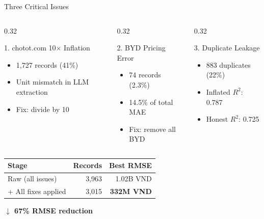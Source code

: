 \documentclass[aspectratio=169]{beamer}
\begin{document}
\begin{frame}{Three Critical Issues}
  \begin{columns}[T]
    \begin{column}{0.32\textwidth}
      \begin{block}{\small 1. chotot.com 10$\times$ Inflation}
        \small
        \begin{itemize}
          \item 1,727 records (41\%)
          \item Unit mismatch in LLM extraction
          \item Fix: divide by 10
        \end{itemize}
      \end{block}
    \end{column}
    \begin{column}{0.32\textwidth}
      \begin{block}{\small 2. BYD Pricing Error}
        \small
        \begin{itemize}
          \item 74 records (2.3\%)
          \item 14.5\% of total MAE
          \item Fix: remove all BYD
        \end{itemize}
      \end{block}
    \end{column}
    \begin{column}{0.32\textwidth}
      \begin{block}{\small 3. Duplicate Leakage}
        \small
        \begin{itemize}
          \item 883 duplicates (22\%)
          \item Inflated $R^2$: 0.787
          \item Honest $R^2$: 0.725
        \end{itemize}
      \end{block}
    \end{column}
  \end{columns}

  \vspace{1em}
  \centering
  \begin{tabular}{lrr}
    \toprule
    \textbf{Stage} & \textbf{Records} & \textbf{Best RMSE} \\
    \midrule
    Raw (all issues) & 3,963 & 1.02B VND \\
    + All fixes applied & 3,015 & \textbf{332M VND} \\
    \bottomrule
  \end{tabular}
  \quad \textcolor{fptgood}{\textbf{$\downarrow$ 67\% RMSE reduction}}
\end{frame}
\end{document}
